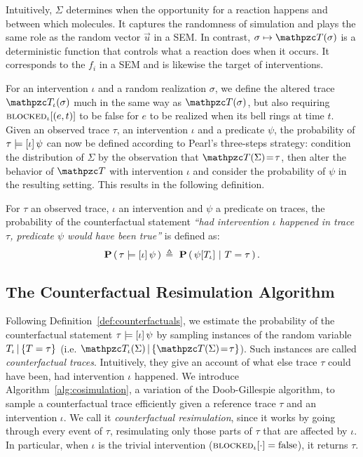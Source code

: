 Intuitively, $\Sigma$ determines when the opportunity for a reaction
happens and between which molecules. It captures the randomness of
simulation and plays the same role as the random vector $\vec u$ in a
SEM. In contrast, $\sigma \mapsto \DetTrace(\sigma)$ is a deterministic
function that controls what a reaction does when it occurs.  It
corresponds to the $f_i$ in a SEM and is likewise the target of
interventions.


For an intervention $\iota$ and a random realization $\sigma$, we
define the altered trace $\DetTrace_\iota(\sigma)$ much in the same way as
$\DetTrace(\sigma)$, but also requiring ${\textsc{blocked}}_{\iota}[(e, t)]$ to be false
for $e$ to be realized when its bell rings at time $t$.  Given an
observed trace $\tau$, an intervention $\iota$ and a predicate $\psi$,
the probability of $\tau \models [\iota] \, \psi{}$ can now be defined according to Pearl's
three-steps strategy: \ItAbduction{} condition the distribution of
$\Sigma$ by the observation that $\DetTrace(\Sigma)\!=\!\tau$, then
\ItAction{} alter the behavior of $\DetTrace$ with intervention $\iota$ and
\ItPrediction{} consider the probability of $\psi$ in the resulting
setting. This results in the following definition.

\begin{definition}
  \label{def:counterfactuals}
  For $\tau$ an observed trace, $\iota$ an intervention and $\psi$ a
  predicate on traces, the probability of the counterfactual statement
  \textit{``had intervention $\iota$ happened in trace $\tau$,
    predicate $\psi$ would have been true''} is defined as:
  \[ \mathbf{P} \left(\, \tau \models [\iota] \, \psi{} \,\right){} \triangleq \ \mathbf{P} \left(\, \psi[{T_\iota}{}] \,\, | \,\,
      T = \tau \,\right). \]
\end{definition}

\subsection{The Counterfactual Resimulation Algorithm}
\label{subsec:cosim-algo}

Following Definition~\ref{def:counterfactuals}, we estimate the
probability of the counterfactual statement $\tau \models [\iota] \, \psi{}$ by sampling
instances of the random variable ${T_\iota\,|\,\{T=\tau\}}{}$ (i.e.
$\DetTrace_\iota(\Sigma) \,|\, \{ \DetTrace(\Sigma) \!=\! \tau \}$).  Such instances
are called \emph{counterfactual traces}. Intuitively, they give an
account of what else trace $\tau$ could have been, had intervention
$\iota$ happened.  We introduce Algorithm~\ref{alg:cosimulation}, a
variation of the Doob-Gillespie algorithm, to sample a counterfactual
trace efficiently given a reference trace $\tau$ and an intervention
$\iota$. We call it \emph{counterfactual resimulation}, since it works
by going through every event of $\tau$, resimulating only those parts
of $\tau$ that are affected by $\iota$. In particular, when $\iota$ is
the trivial intervention (${\textsc{blocked}}_{\iota}[\cdot] = \text{false}$), it
returns $\tau$.

